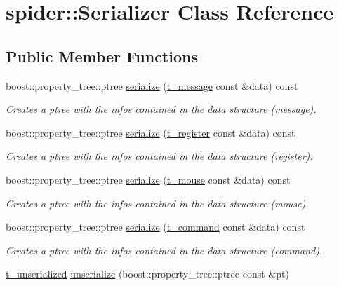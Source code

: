 \hypertarget{classspider_1_1_serializer}{}\section{spider\+:\+:Serializer Class Reference}
\label{classspider_1_1_serializer}
\subsection*{Public Member Functions}
\begin{DoxyCompactItemize}
\item 
boost\+::property\+\_\+tree\+::ptree \hyperlink{classspider_1_1_serializer_ad8cbce40137efc7be3cb679a883800f8}{serialize} (\hyperlink{structt__message}{t\+\_\+message} const \&data) const
\begin{DoxyCompactList}\small\item\em Creates a ptree with the infos contained in the data structure (message). \end{DoxyCompactList}\item 
boost\+::property\+\_\+tree\+::ptree \hyperlink{classspider_1_1_serializer_adca362ee0cd4c86234dd3f85fc62390b}{serialize} (\hyperlink{structt__register}{t\+\_\+register} const \&data) const
\begin{DoxyCompactList}\small\item\em Creates a ptree with the infos contained in the data structure (register). \end{DoxyCompactList}\item 
boost\+::property\+\_\+tree\+::ptree \hyperlink{classspider_1_1_serializer_a758144d21b9e7334b9a45736095e175f}{serialize} (\hyperlink{structt__mouse}{t\+\_\+mouse} const \&data) const
\begin{DoxyCompactList}\small\item\em Creates a ptree with the infos contained in the data structure (mouse). \end{DoxyCompactList}\item 
boost\+::property\+\_\+tree\+::ptree \hyperlink{classspider_1_1_serializer_a939015316b28fb2ed6021bf6f4ee81df}{serialize} (\hyperlink{structt__command}{t\+\_\+command} const \&data) const
\begin{DoxyCompactList}\small\item\em Creates a ptree with the infos contained in the data structure (command). \end{DoxyCompactList}\item 
\hyperlink{structt__unserialized}{t\+\_\+unserialized} \hyperlink{classspider_1_1_serializer_af3bdf08f49c4c9f6111b392264256b7b}{unserialize} (boost\+::property\+\_\+tree\+::ptree const \&pt)

\end{DoxyCompactItemize}
